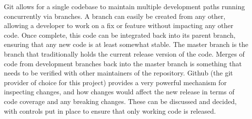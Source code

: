 Git allows for a single codebase to maintain multiple development paths running concurrently via branches. A branch can easily be created from any other, allowing a developer to work on a fix or feature without impacting any other code. Once complete, this code can be integrated back into its parent branch, ensuring that any new code is at least somewhat stable. The master branch is the branch that traditionally holds the current release version of the code. Merges of code from development branches back into the master branch is something that needs to be verified with other maintainers of the repository. Github (the git provider of choice for this project) provides a very powerful mechanism for inspecting changes, and how changes would affect the new release in terms of code coverage and any breaking changes. These can be discussed and decided, with controls put in place to ensure that only working code is released.
